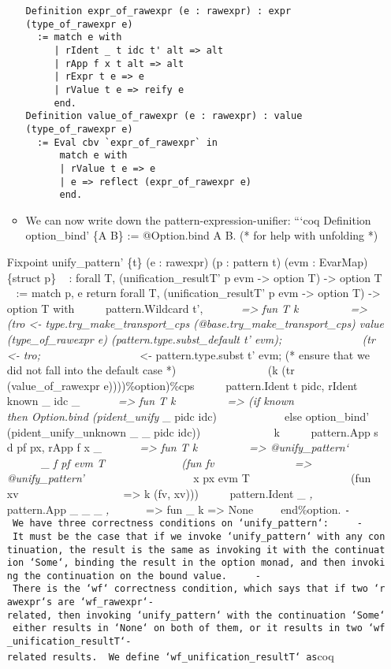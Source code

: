\begin{itemize}
\begin{itemize}
\begin{verbatim}
Definition expr_of_rawexpr (e : rawexpr) : expr (type_of_rawexpr e)
  := match e with
     | rIdent _ t idc t' alt => alt
     | rApp f x t alt => alt
     | rExpr t e => e
     | rValue t e => reify e
     end.
Definition value_of_rawexpr (e : rawexpr) : value (type_of_rawexpr e)
  := Eval cbv `expr_of_rawexpr` in
      match e with
      | rValue t e => e
      | e => reflect (expr_of_rawexpr e)
      end.
\end{verbatim}
  \item
    We can now write down the pattern-expression-unifier: ```coq
    Definition option\_bind' \{A B\} := @Option.bind A B. (* for help
    with unfolding *)
  \end{itemize}

  Fixpoint unify\_pattern' \{t\} (e : rawexpr) (p : pattern t) (evm :
  EvarMap) \{struct p\} ~ : forall T, (unification\_resultT' p evm
  -\textgreater{} option T) -\textgreater{} option T ~ := match p, e
  return forall T, (unification\_resultT' p evm -\textgreater{} option
  T) -\textgreater{} option T with ~ ~ ~\textbar{} pattern.Wildcard t',
  \emph{ ~ ~ ~ ~=\textgreater{} fun T k ~ ~ ~ ~ ~ =\textgreater{} (tro
  \textless{}- type.try\_make\_transport\_cps
  (@base.try\_make\_transport\_cps) value (type\_of\_rawexpr e)
  (pattern.type.subst\_default t' evm); ~ ~ ~ ~ ~ ~ ~ ~ (tr \textless{}-
  tro; ~ ~ ~ ~ ~ ~ ~ ~ ~ ~} \textless{}- pattern.type.subst t' evm; (*
  ensure that we did not fall into the default case *) ~ ~ ~ ~ ~ ~ ~ ~ ~
  ~(k (tr (value\_of\_rawexpr e))))\%option)\%cps ~ ~ ~\textbar{}
  pattern.Ident t pidc, rIdent known \_ idc \_ \emph{ ~ ~ ~
  ~=\textgreater{} fun T k ~ ~ ~ ~ ~ =\textgreater{} (if known ~ ~ ~ ~ ~
  ~ ~ then Option.bind (pident\_unify } \_ pidc idc) ~ ~ ~ ~ ~ ~ ~ else
  option\_bind' (pident\_unify\_unknown \_ \_ pidc idc)) ~ ~ ~ ~ ~ ~ ~
  ~k ~ ~ ~\textbar{} pattern.App s d pf px, rApp f x \_ \emph{ ~ ~ ~
  ~=\textgreater{} fun T k ~ ~ ~ ~ ~ =\textgreater{} @unify\_pattern`~ ~
  ~ ~ ~ ~ ~ ~\_ f pf evm T ~ ~ ~ ~ ~ ~ ~ ~(fun fv ~ ~ ~ ~ ~ ~ ~ ~
  =\textgreater{} @unify\_pattern' ~ ~ ~ ~ ~ ~ ~ ~ ~ ~ ~} x px evm T ~ ~
  ~ ~ ~ ~ ~ ~ ~ ~ ~(fun xv ~ ~ ~ ~ ~ ~ ~ ~ ~ ~ ~ =\textgreater{} k (fv,
  xv))) ~ ~ ~\textbar{} pattern.Ident \_ \emph{, } ~ ~ ~\textbar{}
  pattern.App \_ \_ \_ \emph{, } ~ ~ ~ ~=\textgreater{} fun \_ k
  =\textgreater{} None ~ ~ ~end\%option.
  \texttt{-\ We\ have\ three\ correctness\ conditions\ on\ `unify\_pattern\textquotesingle{}`:\ \ \ \ \ -\ It\ must\ be\ the\ case\ that\ if\ we\ invoke\ `unify\_pattern\textquotesingle{}`\ with\ any\ continuation,\ the\ result\ is\ the\ same\ as\ invoking\ it\ with\ the\ continuation\ `Some`,\ binding\ the\ result\ in\ the\ option\ monad,\ and\ then\ invoking\ the\ continuation\ on\ the\ bound\ value.\ \ \ \ \ -\ There\ is\ the\ `wf`\ correctness\ condition,\ which\ says\ that\ if\ two\ `rawexpr`s\ are\ `wf\_rawexpr`-related,\ then\ invoking\ `unify\_pattern\textquotesingle{}`\ with\ the\ continuation\ `Some`\ either\ results\ in\ `None`\ on\ both\ of\ them,\ or\ it\ results\ in\ two\ `wf\_unification\_resultT\textquotesingle{}`-related\ results.\ \ We\ define\ `wf\_unification\_resultT\textquotesingle{}`\ as}coq

\end{itemize}
